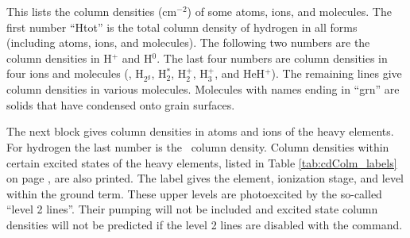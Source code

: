 This lists the column densities (cm$^{-2}$) of some atoms,
ions, and molecules.
The first number ``Htot'' is the total column density of hydrogen in all
forms (including atoms, ions, and molecules).
The following two numbers
are the column densities in H$^+$ and H$^0$.
The last four numbers are column
densities in four ions and molecules (\hminus, H$_{2^{g}}$, H$_2^*$,
H$_2^+$, H$_3^+$, and HeH$^+$).
The remaining lines give column densities in various molecules.
Molecules with names ending in ``grn'' are solids that have
condensed onto grain surfaces.

The next block gives column densities in atoms and ions of the heavy
elements.
For hydrogen the last number is the \htwo\ column density.
Column
densities within certain excited states of the heavy elements,
listed in Table \ref{tab:cdColm_labels} on page \pageref{tab:cdColm_labels}, are also printed.
The label gives the
element, ionization stage, and level within the ground term.
These upper
levels are photoexcited by the so-called ``level 2 lines''.
Their pumping
will not be included and excited state column densities will not be predicted
if the level 2 lines are disabled with the  command.

